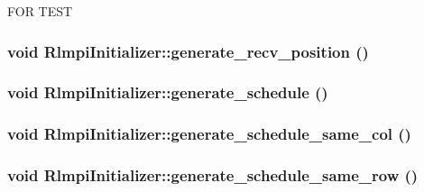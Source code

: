FOR TEST \hypertarget{classRlmpiInitializer_a6940fb6f728fcdb644d52787082b582f}{
\subsubsection[{generate\_\-recv\_\-position}]{\setlength{\rightskip}{0pt plus 5cm}void RlmpiInitializer::generate\_\-recv\_\-position ()}}
\label{classRlmpiInitializer_a6940fb6f728fcdb644d52787082b582f}
\hypertarget{classRlmpiInitializer_a5136c465187a9aff22ebfe4f6dc4e971}{
\subsubsection[{generate\_\-schedule}]{\setlength{\rightskip}{0pt plus 5cm}void RlmpiInitializer::generate\_\-schedule ()}}
\label{classRlmpiInitializer_a5136c465187a9aff22ebfe4f6dc4e971}
\hypertarget{classRlmpiInitializer_a9ae8fa3507bc5d2bee236e2320ae9ce1}{
\subsubsection[{generate\_\-schedule\_\-same\_\-col}]{\setlength{\rightskip}{0pt plus 5cm}void RlmpiInitializer::generate\_\-schedule\_\-same\_\-col ()}}
\label{classRlmpiInitializer_a9ae8fa3507bc5d2bee236e2320ae9ce1}
\hypertarget{classRlmpiInitializer_a2e01c4b0ff789de3d50df5b7ead1e86d}{
\subsubsection[{generate\_\-schedule\_\-same\_\-row}]{\setlength{\rightskip}{0pt plus 5cm}void RlmpiInitializer::generate\_\-schedule\_\-same\_\-row ()}}
\label{classRlmpiInitializer_a2e01c4b0ff789de3d50df5b7ead1e86d}
